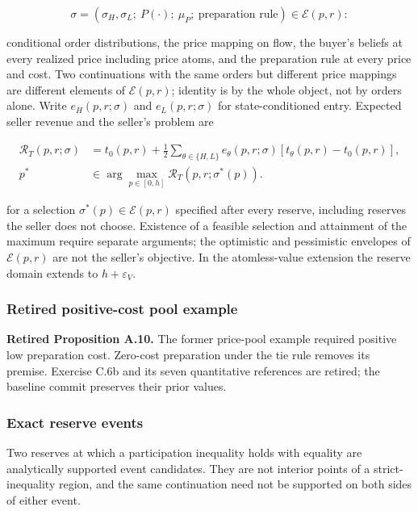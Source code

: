 \documentclass[
  12pt,
]{article}
\begin{document}
\[
\sigma=(\sigma_H,\sigma_L;\ P(\cdot);\ \mu_P;\ \text{preparation rule})\in\mathcal E(p,r):
\tag{A.43}\label{eq:paper-a-43}
\]

conditional order distributions, the price mapping on flow, the buyer's
beliefs at every realized price including price atoms, and the
preparation rule at every price and cost. Two continuations with the
same orders but different price mappings are different elements of
\(\mathcal E(p,r)\); identity is by the whole object, not by orders
alone. Write \(e_H(p,r;\sigma)\) and \(e_L(p,r;\sigma)\) for
state-conditioned entry. Expected seller revenue and the seller's
problem are

\[
\begin{aligned}
\mathcal R_T(p,r;\sigma)
&=t_0(p,r)+\frac12\sum_{\theta\in\{H,L\}}e_\theta(p,r;\sigma)
[t_\theta(p,r)-t_0(p,r)],\\
p^*&\in\arg\max_{p\in[0,h]}\mathcal R_T(p,r;\sigma^*(p)).
\end{aligned}
\tag{A.44}\label{eq:paper-a-44}
\]

for a selection \(\sigma^*(p)\in\mathcal E(p,r)\) specified after every
reserve, including reserves the seller does not choose. Existence of a
feasible selection and attainment of the maximum require separate
arguments; the optimistic and pessimistic envelopes of
\(\mathcal E(p,r)\) are not the seller's objective. In the
atomless-value extension the reserve domain extends to
\(h+\varepsilon_V\).

\subsubsection{Retired positive-cost pool
example}\label{retired-positive-cost-pool-example}

\protect{}\label{result-proposition-a-10}{\textbf{Retired
Proposition A.10.}} The former price-pool example required positive low
preparation cost. Zero-cost preparation under the tie rule removes its
premise. Exercise C.6b and its seven quantitative references are
retired; the baseline commit preserves their prior values.

\subsubsection{Exact reserve events}\label{exact-reserve-events}

Two reserves at which a participation inequality holds with equality are
analytically supported event candidates. They are not interior points of
a strict-inequality region, and the same continuation need not be
supported on both sides of either event.
\end{document}
